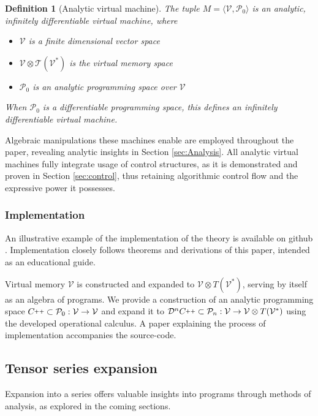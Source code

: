 \documentclass[smallcondensed]{svjour3}
\newcommand{\T}{\mathcal{T}}
\newcommand{\VV}{\mathcal{V}}
\newcommand{\CC}{C\nolinebreak\hspace{-.05em}\raisebox{.4ex}{\tiny\bf +}\nolinebreak\hspace{-.10em}\raisebox{.4ex}{\tiny\bf +}}
\def\CC{{C\nolinebreak[4]\hspace{-.05em}\raisebox{.4ex}{\tiny\bf ++}}}
\newcommand{\dP}{\mathcal{P}}
\newcommand{\DD}{\mathcal{D}}
\newtheorem{definicija}{Definition}[section]
\begin{document}
\begin{definicija}[Analytic virtual machine]\label{def:analyticMachine}
The tuple $M=\langle \VV,\dP_0\rangle$ is an analytic, infinitely  differentiable virtual machine, where
   
    \begin{itemize}
    \item
    $\VV$ is a finite dimensional vector space
    \item
    $\VV\otimes \T(\VV^*)$ is the virtual memory space
    \item
    $\dP_0$ is an analytic programming space over $\VV$
    \end{itemize}
    When $\dP_0$ is a differentiable programming space, this defines an
    infinitely differentiable virtual machine.
  \end{definicija}
Algebraic manipulations these machines enable are employed throughout the paper, revealing analytic insights in Section \ref{sec:Analysis}.  All analytic virtual machines fully integrate usage of control structures, as it is demonstrated and proven in Section \ref{sec:control}, thus retaining algorithmic control flow and the expressive power it possesses.

\subsubsection{Implementation}

An illustrative example of the implementation of the theory is available on github \cite{dC++}. Implementation closely follows theorems and derivations of this paper, intended as an educational guide.

Virtual memory $\VV$ is constructed and expanded to $\VV\otimes T(\VV^*)$, serving by itself as an algebra of programs. We provide a construction of an analytic programming space $\CC\subset \dP_0:\VV\to\VV$ and expand it to $\DD^n\CC\subset\dP_n:\VV\to\VV\otimes T(\VV^*)$ using the developed operational calculus. A paper \cite{dC++Paper} explaining the process of implementation accompanies the source-code. 

 \subsection{Tensor series expansion}\label{sec:Vrsta}
 
 Expansion into a series offers valuable insights into programs through methods of analysis, as explored in the coming sections.
 
\end{document}
